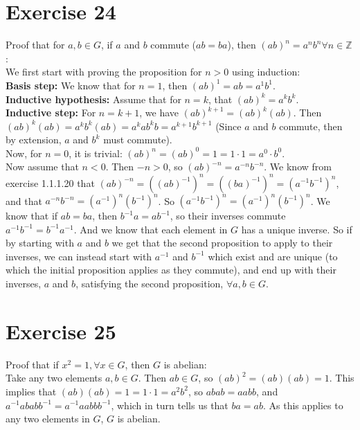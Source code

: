 \documentclass{article}
\newcommand{\Z}{\mathbb{Z}}
\begin{document}
    
    \section*{Exercise 24}
    Proof that for $a, b \in G$,
    if $a$ and $b$ commute ($ab = ba$),
    then $(ab)^n = a^nb^n \forall n \in \Z$: \\
    We first start with proving the proposition for $n > 0$ using induction: \\
    \textbf{Basis step:}
    We know that for $n = 1$, then $(ab)^1 = ab = a^1b^1$. \\
    \textbf{Inductive hypothesis:}
    Assume that for $n = k$, that $(ab)^k = a^kb^k$. \\
    \textbf{Inductive step:}
    For $n = k + 1$, we have $(ab)^{k+1} = (ab)^k(ab)$.
    Then $(ab)^k(ab) = a^kb^k(ab) = a^kab^kb = a^{k+1}b^{k+1}$
    (Since $a$ and $b$ commute,
    then by extension, $a$ and $b^k$ must commute). \\
    Now, for $n = 0$, it is trivial:
    $(ab)^n = (ab)^0 = 1 = 1 \cdot 1 = a^0 \cdot b^0$. \\
    Now assume that $n < 0$.
    Then $-n > 0$,
    so $(ab)^{-n} = a^{-n}b^{-n}$.
    We know from exercise 1.1.1.20 that $(ab)^{-n}
    = ((ab)^{-1})^n
    = ((ba)^{-1})^n
    = (a^{-1}b^{-1})^n$,
    and that $a^{-n}b^{-n} = (a^{-1})^n(b^{-1})^n$.
    So $(a^{-1}b^{-1})^n = (a^{-1})^n(b^{-1})^n$.
    We know that if $ab = ba$,
    then $b^{-1}a = ab^{-1}$,
    so their inverses commute $a^{-1}b^{-1} = b^{-1}a^{-1}$.
    And we know that each element in $G$ has a unique inverse.
    So if by starting with $a$ and $b$
    we get that the second proposition to apply to their inverses,
    we can instead start with $a^{-1}$ and $b^{-1}$ which exist and are unique
    (to which the initial proposition applies as they commute),
    and end up with their inverses, $a$ and $b$, satisfying the second
    proposition, $\forall a, b \in G$.


    \section*{Exercise 25}
    Proof that if $x^2 = 1, \forall x \in G$,
    then $G$ is abelian: \\
    Take any two elements $a, b \in G$.
    Then $ab \in G$,
    so $(ab)^2 = (ab)(ab) = 1$.
    This implies that $(ab)(ab) = 1 = 1 \cdot 1 = a^2b^2$,
    so $abab = aabb$,
    and $a^{-1}ababb^{-1} = a^{-1}aabbb^{-1}$,
    which in turn tells us that $ba = ab$.
    As this applies to any two elements in $G$, $G$ is abelian.
\end{document}
